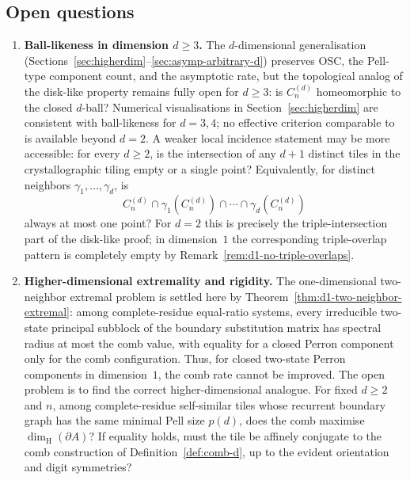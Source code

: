 \documentclass{amsart}
\theoremstyle{definition}
\theoremstyle{remark}
\newcommand{\dH}{\dim_{\mathrm{H}}}
\begin{document}
\subsection*{Open questions}

\begin{enumerate}

\item \textbf{Ball-likeness in dimension $d \ge 3$.}
The $d$-dimensional generalisation
(Sections~\ref{sec:higherdim}--\ref{sec:asymp-arbitrary-d})
preserves OSC, the Pell-type component count, and the
asymptotic rate, but the topological analog of the disk-like
property remains fully open for $d \ge 3$: is $C_n^{(d)}$
homeomorphic to the closed $d$-ball?  Numerical visualisations
in Section~\ref{sec:higherdim} are consistent with ball-likeness
for $d = 3, 4$; no effective criterion comparable
to~\cite{loridant-luo-thuswaldner} is available beyond $d = 2$.
A weaker local incidence statement may be more accessible: for every
$d\ge2$, is the intersection of any $d+1$ distinct tiles in the
crystallographic tiling empty or a single point?  Equivalently, for
distinct neighbors $\gamma_1,\ldots,\gamma_d$, is
\[
  C_n^{(d)} \cap \gamma_1(C_n^{(d)}) \cap \cdots \cap
  \gamma_d(C_n^{(d)})
\]
always at most one point?  For $d=2$ this is precisely the
triple-intersection part of the disk-like proof; in dimension~$1$ the
corresponding triple-overlap pattern is completely empty by
Remark~\ref{rem:d1-no-triple-overlaps}.

\item \textbf{Higher-dimensional extremality and rigidity.}
The one-dimensional two-neighbor extremal problem is settled here by
Theorem~\ref{thm:d1-two-neighbor-extremal}: among complete-residue
equal-ratio systems, every irreducible two-state principal subblock
of the boundary substitution matrix has spectral radius at most the
comb value, with equality for a closed Perron component only for the
comb configuration.  Thus, for closed two-state Perron components in
dimension~$1$, the comb rate cannot be improved.  The open problem is
to find the correct higher-dimensional analogue.  For fixed $d\ge2$ and $n$, among
complete-residue self-similar tiles whose recurrent boundary graph has
the same minimal Pell size $p(d)$, does the comb maximise
$\dH(\partial A)$?  If equality holds, must the tile be affinely
conjugate to the comb construction of Definition~\ref{def:comb-d},
up to the evident orientation and digit symmetries?


\end{enumerate}
\end{document}
